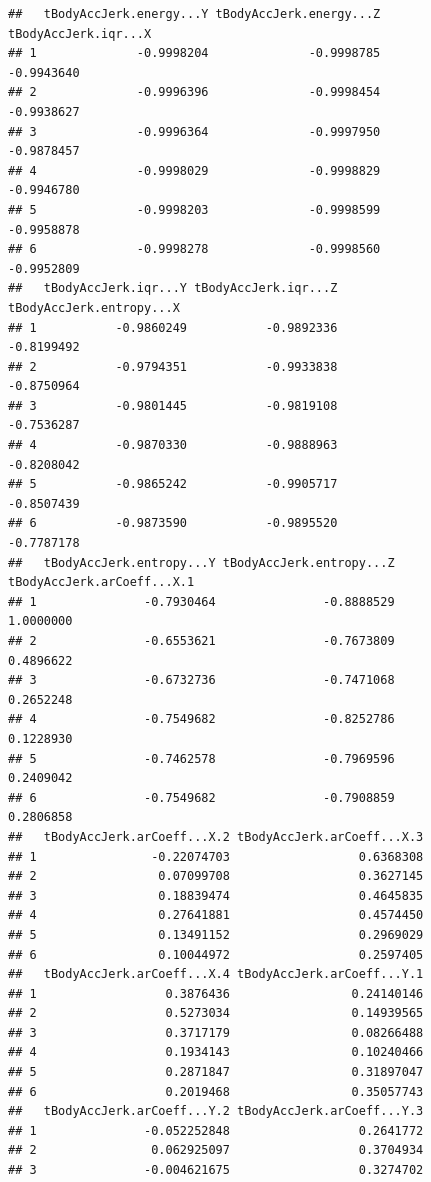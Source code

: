 \documentclass[
]{article}
\begin{document}
\begin{verbatim}
##   tBodyAccJerk.energy...Y tBodyAccJerk.energy...Z tBodyAccJerk.iqr...X
## 1              -0.9998204              -0.9998785           -0.9943640
## 2              -0.9996396              -0.9998454           -0.9938627
## 3              -0.9996364              -0.9997950           -0.9878457
## 4              -0.9998029              -0.9998829           -0.9946780
## 5              -0.9998203              -0.9998599           -0.9958878
## 6              -0.9998278              -0.9998560           -0.9952809
##   tBodyAccJerk.iqr...Y tBodyAccJerk.iqr...Z tBodyAccJerk.entropy...X
## 1           -0.9860249           -0.9892336               -0.8199492
## 2           -0.9794351           -0.9933838               -0.8750964
## 3           -0.9801445           -0.9819108               -0.7536287
## 4           -0.9870330           -0.9888963               -0.8208042
## 5           -0.9865242           -0.9905717               -0.8507439
## 6           -0.9873590           -0.9895520               -0.7787178
##   tBodyAccJerk.entropy...Y tBodyAccJerk.entropy...Z tBodyAccJerk.arCoeff...X.1
## 1               -0.7930464               -0.8888529                  1.0000000
## 2               -0.6553621               -0.7673809                  0.4896622
## 3               -0.6732736               -0.7471068                  0.2652248
## 4               -0.7549682               -0.8252786                  0.1228930
## 5               -0.7462578               -0.7969596                  0.2409042
## 6               -0.7549682               -0.7908859                  0.2806858
##   tBodyAccJerk.arCoeff...X.2 tBodyAccJerk.arCoeff...X.3
## 1                -0.22074703                  0.6368308
## 2                 0.07099708                  0.3627145
## 3                 0.18839474                  0.4645835
## 4                 0.27641881                  0.4574450
## 5                 0.13491152                  0.2969029
## 6                 0.10044972                  0.2597405
##   tBodyAccJerk.arCoeff...X.4 tBodyAccJerk.arCoeff...Y.1
## 1                  0.3876436                 0.24140146
## 2                  0.5273034                 0.14939565
## 3                  0.3717179                 0.08266488
## 4                  0.1934143                 0.10240466
## 5                  0.2871847                 0.31897047
## 6                  0.2019468                 0.35057743
##   tBodyAccJerk.arCoeff...Y.2 tBodyAccJerk.arCoeff...Y.3
## 1               -0.052252848                  0.2641772
## 2                0.062925097                  0.3704934
## 3               -0.004621675                  0.3274702

\end{verbatim}
\end{document}
